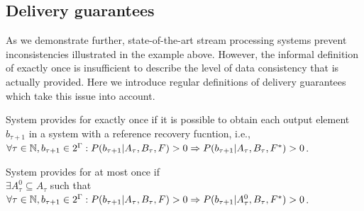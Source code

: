 

\subsection{Delivery guarantees}

As we demonstrate further, state-of-the-art stream processing systems prevent inconsistencies illustrated in the example above. However, the informal definition of exactly once is insufficient to describe the level of data consistency that is actually provided. Here we introduce regular definitions of delivery guarantees which take this issue into account. 

\begin{definition}{System provides for exactly once}
if it is possible to obtain each output element $b_{\tau+1}$ in a system with a reference recovery fucntion, i.e.,\\ 
$\forall{\tau \in \mathbb{N}}, b_{\tau+1}\in 2^{\Gamma}: P(b_{\tau+1}|A_{\tau},B_\tau,F)>0 \Rightarrow \\ P(b_{\tau+1}|A_{\tau},B_\tau,F^{*})>0$.
\end{definition}

\begin{definition}{System provides for at most once}
if \\
$\exists{A^{0}_{\tau}\subseteq{A_{\tau}}}$ such that \\
$\forall{\tau \in \mathbb{N},{b_{\tau+1}\in 2^{\Gamma}}}: P(b_{\tau+1}|A_{\tau},B_\tau,F)>0 \Rightarrow \\ P(b_{\tau+1}|A^{0}_{\tau},B_\tau,F^{*})>0$.
\end{definition}

